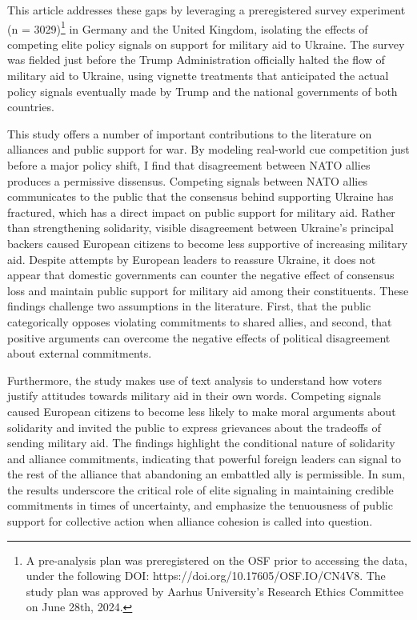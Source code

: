 This article addresses these gaps by leveraging a preregistered survey experiment (n = 3029)\footnote{A pre-analysis plan was preregistered on the OSF prior to accessing the data, under the following DOI: https://doi.org/10.17605/OSF.IO/CN4V8. The study plan was approved by Aarhus University’s Research Ethics Committee on June 28th, 2024.} in Germany and the United Kingdom, isolating the effects of competing elite policy signals on support for military aid to Ukraine. The survey was fielded just before the Trump Administration officially halted the flow of military aid to Ukraine, using vignette treatments that anticipated the actual policy signals eventually made by Trump and the national governments of both countries. 

This study offers a number of important contributions to the literature on alliances and public support for war. By modeling real-world cue competition just before a major policy shift, I find that disagreement between NATO allies produces a permissive dissensus. Competing signals between NATO allies communicates to the public that the consensus behind supporting Ukraine has fractured, which has a direct impact on public support for military aid. Rather than strengthening solidarity, visible disagreement between Ukraine's principal backers caused European citizens to become less supportive of increasing military aid. Despite attempts by European leaders to reassure Ukraine, it does not appear that domestic governments can counter the negative effect of consensus loss and maintain public support for military aid among their constituents. These findings challenge two assumptions in the literature. First, that the public categorically opposes violating commitments to shared allies,\autocite{chiba_careful_2015, tomz_military_2021, levin_art_2022} and second, that positive arguments can overcome the negative effects of political disagreement about external commitments.\autocite{chu_commanding_2021, reiter_manipulating_2024} 

Furthermore, the study makes use of text analysis to understand how voters justify attitudes towards military aid in their own words. Competing signals caused European citizens to become less likely to make moral arguments about solidarity and invited the public to express grievances about the tradeoffs of sending military aid. The findings highlight the conditional nature of solidarity and alliance commitments, indicating that powerful foreign leaders can signal to the rest of the alliance that abandoning an embattled ally is permissible. In sum, the results underscore the critical role of elite signaling in maintaining credible commitments in times of uncertainty, and emphasize the tenuousness of public support for collective action when alliance cohesion is called into question.

